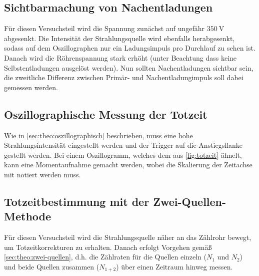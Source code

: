 \subsection{Sichtbarmachung von Nachentladungen}
\label{sec:duch:nachentladungen}

Für diesen Versuchsteil wird die Spannung zunächst auf ungefähr $\SI{350}{\volt}$ abgesenkt. 
Die Intensität der Strahlungsquelle wird ebenfalls herabgesenkt, sodass auf dem Oszillographen 
nur ein Ladungsimpuls pro Durchlauf zu sehen ist. Danach wird die Röhrenspannung stark erhöht (unter Beachtung dass
keine Selbstentladungen ausgelöst werden). Nun sollten Nachentladungen sichtbar sein, die zweitliche Differenz 
zwischen Primär- und Nachentladungimpuls soll dabei gemessen werden.

\subsection{Oszillographische Messung der Totzeit}
\label{sec:durch:oszill-totzeit}

Wie in \autoref{sec:theo:oszillographisch} beschrieben, muss eine hohe Strahlungsintensität eingestellt werden und der
Trigger auf die Anstiegsflanke gestellt werden. Bei einem Oszillogramm, welches dem aus \autoref{fig:totzeit} ähnelt,
kann eine Momentaufnahme gemacht werden, wobei die Skalierung der Zeitachse mit notiert werden muss.

\subsection{Totzeitbestimmung mit der Zwei-Quellen-Methode}
\label{sec:durch:zwei-quellen}

Für diesen Versuchsteil wird die Strahlungsquelle näher an das Zählrohr bewegt, um Totzeitkorrekturen zu erhalten. Danach
erfolgt Vorgehen gemäß \autoref{sec:theo:zwei-quellen}, d.h. die Zählraten für die Quellen einzeln ($N_1$ und $N_2$)
und beide Quellen zusammen ($N_{1+2}$) über einen Zeitraum hinweg messen.
